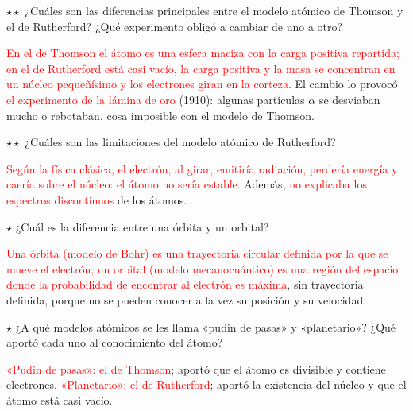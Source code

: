 \begin{exercise}
    \(\star\star\) ¿Cuáles son las diferencias principales entre el modelo atómico de Thomson y el de Rutherford? ¿Qué experimento
    obligó a cambiar de uno a otro?
    \begin{solu}
        \textcolor{red}{En el de Thomson el átomo es una esfera maciza con la carga positiva repartida; en el de Rutherford está
        casi vacío, la carga positiva y la masa se concentran en un núcleo pequeñísimo y los electrones giran en la corteza.} El
        cambio lo provocó \textcolor{red}{el experimento de la lámina de oro} (1910): algunas partículas \(\alpha\) se desviaban
        mucho o rebotaban, cosa imposible con el modelo de Thomson.
    \end{solu}
\end{exercise}

\begin{exercise}
    \(\star\star\) ¿Cuáles son las limitaciones del modelo atómico de Rutherford?
    \begin{solu}
        \textcolor{red}{Según la física clásica, el electrón, al girar, emitiría radiación, perdería energía y caería sobre el
        núcleo: el átomo no sería estable.} Además, \textcolor{red}{no explicaba los espectros discontinuos} de los átomos.
    \end{solu}
\end{exercise}

\begin{exercise}
    \(\star\) ¿Cuál es la diferencia entre una órbita y un orbital?
    \begin{solu}
        \textcolor{red}{Una órbita (modelo de Bohr) es una trayectoria circular definida por la que se mueve el electrón; un
        orbital (modelo mecanocuántico) es una región del espacio donde la probabilidad de encontrar al electrón es máxima}, sin
        trayectoria definida, porque no se pueden conocer a la vez su posición y su velocidad.
    \end{solu}
\end{exercise}

\begin{exercise}
    \(\star\) ¿A qué modelos atómicos se les llama «pudin de pasas» y «planetario»? ¿Qué aportó cada uno al conocimiento del átomo?
    \begin{solu}
        \textcolor{red}{«Pudin de pasas»: el de Thomson}; aportó que el átomo es divisible y contiene electrones.
        \textcolor{red}{«Planetario»: el de Rutherford}; aportó la existencia del núcleo y que el átomo está casi vacío.
    \end{solu}
\end{exercise}

